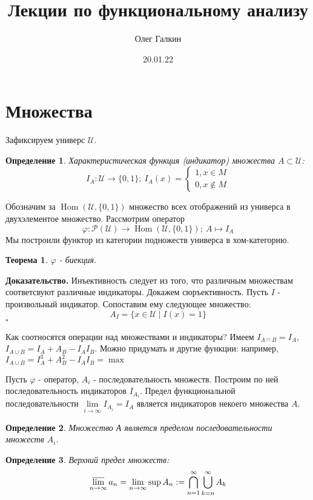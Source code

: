 \documentclass[a4paper]{article}
\author{Олег Галкин}
\title{Лекции по функциональному анализу}
\date{20.01.22}
\newtheorem{defin}{Определение}
\newtheorem{theor}{Теорема}
\DeclareMathOperator{\Hom}{Hom}
\begin{document}
\maketitle
\tableofcontents
\newpage
\section{Множества}
Зафиксируем универс $\mathcal{U}$.
\begin{defin}
Характеристическая функция (индикатор) множества 
$A\subset \mathcal{U}$:
$$I_A\colon\mathcal{U}\to \{0,1\};~I_A(x)=\begin{cases}
    1,x\in M\\0,x\notin M 
\end{cases}$$
\end{defin}
Обозначим за $\Hom(\mathcal{U},\{0,1\})$ множество всех отображений из 
универса в двухэлементое множество. Рассмотрим оператор
$$\varphi\colon\mathcal{P}(\mathcal{U})\to\Hom(\mathcal{U},\{0,1\});~
A\mapsto I_A$$
Мы построили функтор из категории подножеств универса в хом-категорию. 
\begin{theor}
$\varphi$ - биекция.
\end{theor}
\textbf{Доказательство.}  Инъективность следует из того, что различным 
множествам соответсвуют различные индикаторы. Докажем сюръективность. 
Пусть $I$ - произвольный индикатор. Сопоставим ему следующее множество:
 $$A_I=\{x\in \mathcal{U}\mid I(x)=1\}$$
$\square$ 

Как соотносятся операции над множествами и индикаторы?
Имеем $I_{A\cap B}=  I_A$, $I_{A\cup B} = I_A+A_B-I_AI_B$. Можно придумать 
и другие функции: например, $I_{A\cup B} = I_A^3+A_B^2-I_AI_B=\max\limits_{}$

Пусть $\varphi$ - оператор, $A_i$ - последовательность множеств. 
Построим по ней последовательность индикаторов $I_{A_i}$.
Предел функциональной последовательности 
$\lim\limits_{i \to \infty}I_{A_i}=I_A$ 
является индикаторов некоего множества $A$.
\begin{defin}
Множество А является пределом последовательности множеств $A_i$.
\end{defin}
\begin{defin}
Верхний предел множеств: 
\begin{equation}
    \varlimsup\limits_{n \to \infty} a_n = \lim\limits_{n \to \infty} 
    \sup\limits_{} A_n :=\bigcap\limits_{n=1}^\infty
    \bigcup\limits_{k=n}^\infty A_k
\end{equation}
\end{defin}
\end{document}
